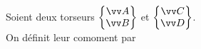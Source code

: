 \documentclass[a4paper]{article}
\begin{document}
\pagestyle{fancy}
\fancyhf{}
\setlength{\headheight}{15pt}

\begin{center}
	\large{}
\end{center}

Soient deux torseurs \( \left\{ \begin{matrix} \vv A \\ \vv B \end{matrix} \right\} \) et \( \left\{ \begin{matrix} \vv C \\ \vv D \end{matrix} \right\} \). \\
On définit leur comoment par
\begin{center}\end{center}
\end{document}
